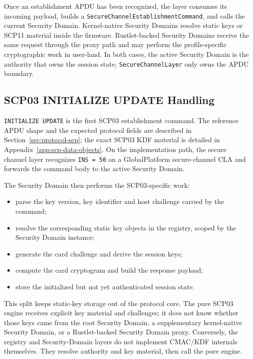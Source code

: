 Once an establishment APDU has been recognized, the layer consumes its incoming
payload, builds a \texttt{SecureChannelEstablishmentCommand}, and calls the
current Security Domain. Kernel-native Security Domains resolve static keys or
SCP11 material inside the firmware. Rustlet-backed Security Domains receive the
same request through the proxy path and may perform the profile-specific
cryptographic work in user-land. In both cases, the active Security Domain is
the authority that owns the session state; \texttt{SecureChannelLayer} only
owns the APDU boundary.

\subsection{SCP03 INITIALIZE UPDATE Handling}
\label{sec:impl-scp-init}

\texttt{INITIALIZE UPDATE} is the first SCP03 establishment command. The
reference APDU shape and the expected protocol fields are described in
Section~\ref{sec:protocol-scp}; the exact SCP03 KDF material is detailed in
Appendix~\ref{app:scp-data-objects}. On the implementation path, the secure
channel layer recognizes \texttt{INS = 50} on a GlobalPlatform secure-channel
CLA and forwards the command body to the active Security Domain.

The Security Domain then performs the SCP03-specific work:
\begin{itemize}
\item parse the key version, key identifier and host challenge carried by the
  command;
\item resolve the corresponding static key objects in the registry, scoped by
  the Security Domain instance;
\item generate the card challenge and derive the session keys;
\item compute the card cryptogram and build the response payload;
\item store the initialized but not yet authenticated session state.
\end{itemize}

This split keeps static-key storage out of the protocol core. The pure SCP03
engine receives explicit key material and challenges; it does not know whether
those keys came from the root Security Domain, a supplementary kernel-native
Security Domain, or a Rustlet-backed Security Domain proxy. Conversely, the
registry and Security-Domain layers do not implement CMAC/KDF internals
themselves. They resolve authority and key material, then call the pure engine.

